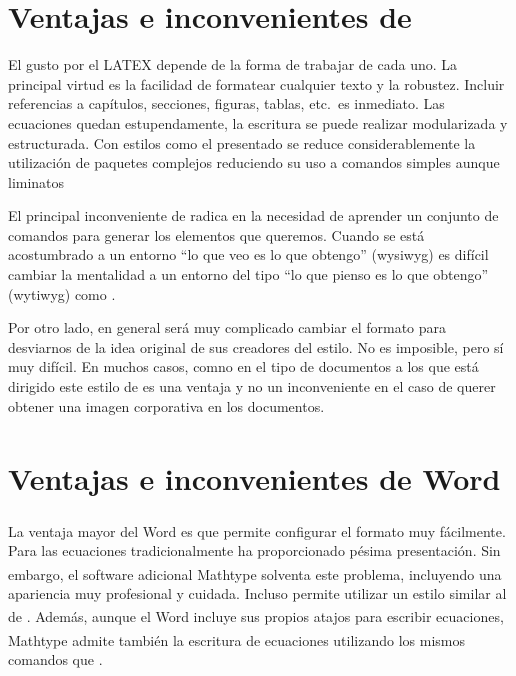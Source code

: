 \section{Ventajas e inconvenientes de \LaTeXe}

El gusto por el LATEX depende de la forma de trabajar de cada uno. La principal virtud
es la facilidad de formatear cualquier texto y la robustez. Incluir referencias a capítulos, secciones, figuras, tablas, etc.\ es
inmediato. Las ecuaciones quedan estupendamente, la escritura se puede realizar modularizada y estructurada. Con estilos como el presentado se reduce considerablemente la utilización de paquetes complejos reduciendo su uso a comandos simples aunque liminatos


El principal inconveniente de \LaTeXe radica en la necesidad de aprender un conjunto de
comandos para generar los elementos que queremos. Cuando se está acostumbrado a un
entorno ``lo que veo es lo que obtengo'' (\acs{wysiwyg}) es difícil cambiar la mentalidad a un entorno del tipo ``lo que pienso es lo que obtengo'' (\acs{wytiwyg}) como \LaTeXe.

Por otro lado, en general será muy complicado cambiar el formato para desviarnos de
la idea original de sus creadores del estilo. No es imposible, pero sí muy difícil. En muchos casos, comno en el tipo de documentos a los que está dirigido este estilo de \LaTeXe es una ventaja y no un inconveniente en el caso de querer obtener una imagen corporativa en los documentos.

\section{Ventajas e inconvenientes de Word\texorpdfstring{\textsuperscript{\textregistered}}{®}}

La ventaja mayor del Word\textsuperscript{\textregistered} es que permite configurar el formato muy fácilmente. Para
las ecuaciones tradicionalmente ha proporcionado pésima presentación. Sin embargo, el software adicional
Mathtype\textsuperscript{\textregistered} solventa este problema, incluyendo una apariencia muy profesional y
cuidada. Incluso permite utilizar un estilo similar al de \LaTeXe. Además, aunque el Word\textsuperscript{\textregistered}
incluye sus propios atajos para escribir ecuaciones, Mathtype\textsuperscript{\textregistered} admite también la escritura de ecuaciones utilizando los mismos comandos que \LaTeXe.

